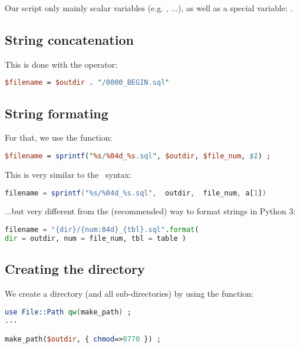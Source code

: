 Our script only mainly scalar variables (e.g. , ...), as well as a special variable: \cmd{\$+} .



\medskip

\subsection*{String concatenation}

This is done with the  operator:

\begin{lstlisting}[language=perl]
$filename = $outdir . "/0000_BEGIN.sql"
\end{lstlisting}




\medskip

\subsection*{String formating}

For that, we use the  function:
\begin{lstlisting}[language=perl]
$filename = sprintf("%s/%04d_%s.sql", $outdir, $file_num, $1) ;
\end{lstlisting}

This is very similar to the \awk\ syntax:
\begin{lstlisting}[language=awk]
filename = sprintf("%s/%04d_%s.sql",  outdir,  file_num, a[1])
\end{lstlisting}

$\dots$but very different from the (recommended) way to format strings in Python 3:
\begin{lstlisting}[language=python]
filename = "{dir}/{num:04d}_{tbl}.sql".format(
dir = outdir, num = file_num, tbl = table )
\end{lstlisting}



\medskip

\subsection*{Creating the directory}


We create a directory (and all sub-directories) by using the  function:

\begin{lstlisting}[language=perl]
use File::Path qw(make_path) ;
...

make_path($outdir, { chmod=>0770 }) ;
\end{lstlisting}




